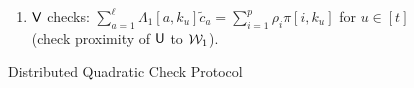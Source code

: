 \begin{figure}[t!]
{\begin{framed}
\begin{enumerate}[{\rm 1.}]
\begin{enumerate}
\begin{itemize}
						\item
						$\innerproduct(\mathsf{pp},f_u^T\Lambda_2,E_u,\innp{\delta}{Z_u})$ for $u\in [t]$ 
						where $E_u=\sum_{i=1}^p\delta_i\comoracle_z[i,k_u]$
					\end{itemize}				
					(consistency of $X_u, Y_u, Z_u$ with $\pi$). 
				\end{enumerate}
				\item $\mathsf{V}$ checks: $\sum_{a=1}^\ell\Lambda_1[a,k_u]\tilde{c}_a=\sum_{i=1}^p\rho_i\pi[i,k_u]$ for $u\in [t]$ (check proximity of $\mathsf{U}$ to $\mathcal{W}_1$).
			\end{enumerate}
		\end{framed}
		\caption{Distributed Quadratic Check Protocol}
		\label{fig:distquadcheck}
	}
\end{figure}

\begin{comment}
\begin{figure}[h!]
\centering
\begin{framed}
\small
\begin{itemize}
\item {$\linearcheck(\FF,\GG,L_1,L_2,A\in \FF^{M\times N},b\in \FF^M,[\pi];\ewit)$}:
\pnote{Why $A$ is not a square matrix?}
\item {\bf Relation}: $\exists \ewit$ s.t. $\ewit=\open(\pi)$ and $A\wit = b$
for $\wit=\dec(\ewit)$.
\item {\bf Oracle Setup}: The prover $\prover$ computes
$\comoracle = \comm(\ewit)$ as in Section \ref{sec:construct_oracle}. 
The prover sets $\pi := \comoracle$ as the oracle.
\begin{enumerate}[{\rm 1.}]
\item $\verifier\rightarrow\prover$: $\verifier$ samples $r\sample \FF^N$ and
sends it to $\prover$.
\pnote{ dimension of $r$ is not correct}
\item $\prover\longleftrightarrow\verifier$: Both $\prover$ and $\verifier$
compute polynomials $R^i$, $i\in [p]$ such that
$R^i(\alpha_j,\zeta_k)=R[i,j,k]$, where $R=r^TA$. 
\item $\prover$ computes:
	\begin{enumerate}
	\item Polynomials $p_j(\cdot) := \sum_{i\in
[p]}R^i(\alpha_j,\cdot).Q^i(\alpha,\cdot)$ for $j\in [h]$.
	\item An $h\times n$ matrix $P$ such that $P[j,k]=p_j(\eta_k)$.
	\item Commitments $c_k=\comm(P[\cdot,k],\omega_k)$ for $k\in [s+\ell]$

\end{comment}
